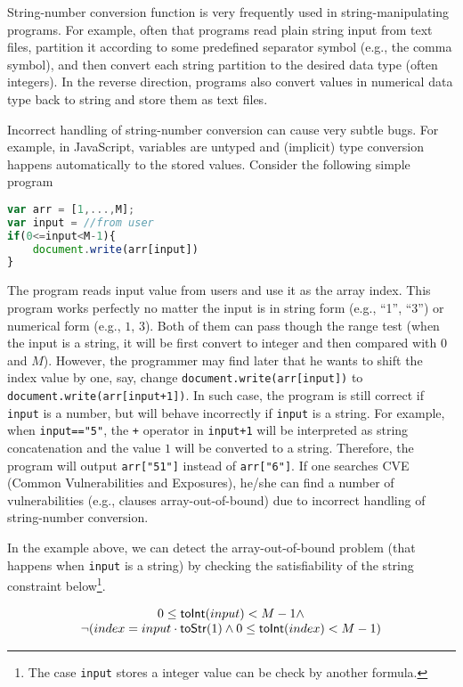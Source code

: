 \documentclass[sigplan,review,anonymous]{acmart}\settopmatter{printfolios=true,printccs=false,printacmref=false}
\begin{document}
String-number conversion function is very frequently used in string-manipulating programs. For example, often that programs read plain string input from text files, partition it according to some predefined separator symbol (e.g., the comma symbol), and then convert each string partition to the desired data type (often integers). In the reverse direction, programs also convert values in numerical data type back to string and store them as text files. 

Incorrect handling of string-number conversion can cause very subtle bugs.
For example, in JavaScript, variables are untyped and (implicit) type conversion happens automatically to the stored values. Consider the following simple program


\begin{lstlisting}[breaklines=true,language=JavaScript]
var arr = [1,...,M];
var input = //from user
if(0<=input<M-1){
	document.write(arr[input])
}
\end{lstlisting}

The program reads input value from users and use it as the array index. This program works perfectly no matter the input is in string form (e.g., ``1'', ``3'') or numerical form (e.g., $1$, $3$). Both of them can pass though the range test (when the input is a string, it will be first convert to integer and then compared with $0$ and $M$). However, the programmer may find later that he wants to shift the index value by one, say, change \texttt{document.write(arr[input])} to \texttt{document.write(arr[input+1])}. In such case, the program is still correct if \texttt{input} is a number, but will behave incorrectly if \texttt{input} is a string. For example, when \texttt{input=="5"}, the \texttt{+} operator in \texttt{input+1} will be interpreted as string concatenation and the value $1$ will be converted to a string. Therefore, the program will output \texttt{arr["51"]} instead of \texttt{arr["6"]}. If one searches CVE (Common Vulnerabilities and Exposures), he/she can find a number of vulnerabilities (e.g., clauses array-out-of-bound) due to incorrect handling of string-number conversion.

In the example above, we can detect the array-out-of-bound problem (that happens when \texttt{input} is a string) by checking the satisfiability of the string constraint below\footnote{The case \texttt{input} stores a integer value can be check by another formula.}. 

$$
\begin{array}{c}
0 \leq \mbox{\textsf{toInt}($input$)}<M-1 \wedge \\
\neg(index = input\cdot \mbox{\textsf{toStr}($1$)} \wedge 0 \leq \mbox{\textsf{toInt}($index$)} <M-1)
\end{array}
$$
\end{document}
